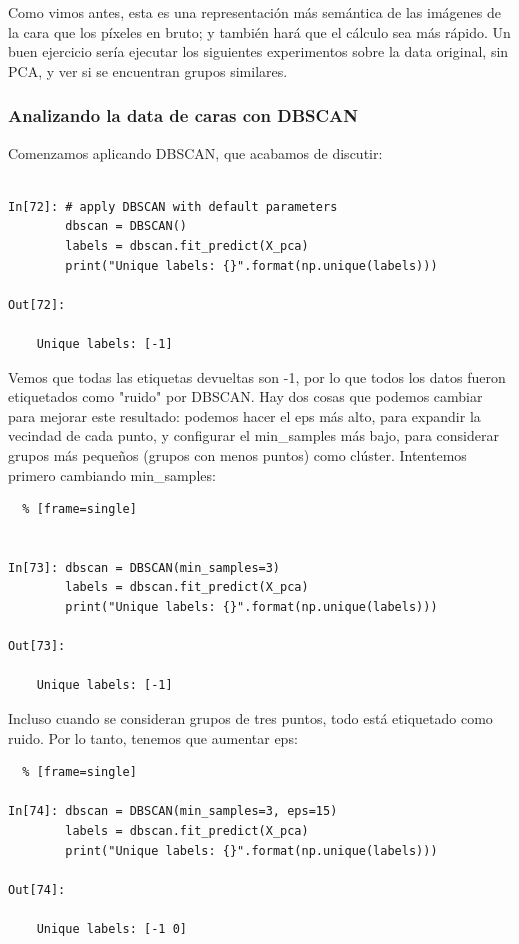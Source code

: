 Como vimos antes,  esta es una representación más semántica de las imágenes de la cara que los píxeles en bruto; y  también hará que el cálculo sea más rápido. Un buen ejercicio sería ejecutar los siguientes experimentos sobre la data  original, sin PCA, y ver si se encuentran grupos similares.


\subsubsection{Analizando la data de caras con DBSCAN}
 
 Comenzamos  aplicando  DBSCAN, que acabamos de discutir:

\begin{lstlisting} 

In[72]: # apply DBSCAN with default parameters
        dbscan = DBSCAN()
        labels = dbscan.fit_predict(X_pca)
        print("Unique labels: {}".format(np.unique(labels)))

Out[72]:
    
    Unique labels: [-1]

\end{lstlisting} 



Vemos que todas las etiquetas devueltas son -1, por lo que todos los datos fueron etiquetados como "{}ruido"{}  por DBSCAN. Hay dos cosas que podemos cambiar para mejorar este resultado: podemos hacer el {\ttfamily eps} más alto, para expandir la vecindad de cada punto, y configurar el {\ttfamily min\_samples} más bajo, para considerar grupos más pequeños (grupos con menos puntos) como clúster. Intentemos primero cambiando {\ttfamily min\_samples}:


\begin{lstlisting}  % [frame=single]	


In[73]: dbscan = DBSCAN(min_samples=3)
        labels = dbscan.fit_predict(X_pca)
        print("Unique labels: {}".format(np.unique(labels)))

Out[73]:
    
    Unique labels: [-1]

\end{lstlisting} 


Incluso cuando se consideran grupos de tres puntos, todo está etiquetado como ruido. Por 
lo tanto, tenemos que aumentar {\ttfamily eps}:

\begin{lstlisting}  % [frame=single]	

In[74]: dbscan = DBSCAN(min_samples=3, eps=15)
        labels = dbscan.fit_predict(X_pca)
        print("Unique labels: {}".format(np.unique(labels)))

Out[74]:

    Unique labels: [-1 0]


\end{lstlisting} 




